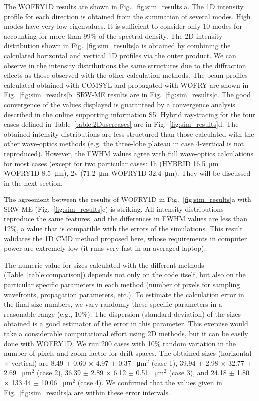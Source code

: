 \documentclass[preprint]{iucr}
\newcommand{\inred}[1]{{\color{red}#1}}
\begin{document}
The WOFRY1D results are shown in Fig.~\ref{fig:sim_results}a. The 1D intensity profile for each direction is obtained from the summation of several modes. High modes have very low eigenvalues. It is sufficient to consider only 10 modes for accounting \inred{for} more \inred{than} 99\% of the spectral density. The 2D intensity distribution shown in Fig.~\ref{fig:sim_results}a is obtained \inred{by} combining the calculated horizontal and vertical 1D profiles via the outer product. 
We can observe in the intensity distributions the same structures due to the diffraction effects \inred{as} those observed with the other calculation methods.
The beam profiles calculated obtained with COMSYL and propagated with WOFRY are shown in Fig.~\ref{fig:sim_results}b. 
SRW-ME results are in Fig.~\ref{fig:sim_results}c. The good convergence of the values displayed is guarantee\inred{d} by a convergence analysis described in \inred{the online supporting information S5}.
Hybrid ray-tracing for the four cases defined in Table~\ref{table:2Dusercases} are in  Fig.~\ref{fig:sim_results}d. The obtained intensity distributions are less structured than those calculated with the other wave-optics methods (e.g. the three-lobe plateau in case 4-vertical is not reproduced). However, the FWHM values \inred{agree} with full wave-optics calculations for most cases (\inred{except for} two particular cases:
1h (HYBRID \SI{16.5}{\micro\meter} WOFRY1D \SI{8.5}{\micro\meter}),
2v (\SI{71.2}{\micro\meter} WOFRY1D \SI{32.4}{\micro\meter}). They will be discussed in the next section.

The agreement between the results of WOFRY1D in Fig.~\ref{fig:sim_results}a with SRW-ME (Fig.~\ref{fig:sim_results}c) is striking. All intensity distributions reproduce the same features, and the differences in FWHM values are less than 12\%, a value that is compatible with the errors of the simulations. 
This result validates the 1D CMD method proposed here, whose requirements in computer power are extremely low (it runs very fast in an averaged laptop). 

The numeric value for sizes calculated with the different methods (Table~\ref{table:comparison}) depends not only on the code itself, but also on the particular specific parameters in each method (number of pixels for sampling wavefronts, propagation parameters, etc.). To estimate the calculation error in the final size numbers, we vary randomly these specific parameters in a reasonable range (e.g., 10\%). The dispersion (standard deviation) of the sizes obtained \inred{is a good estimator} of the error in this parameter. This exercise would take a considerable computational effort using 2D methods, but it can be easily done with WOFRY1D. We run 200 cases with 10\% random \inred{variation in the number of pixels and zoom factor for} drift spaces. The obtained sizes (horizontal $\times$ vertical) are  
8.49 $\pm$ 0.60 $\times$ 4.97 $\pm$ 0.37 \SI{}{\micro\meter}$^2$ (case 1),
39.94 $\pm$ 2.98 $\times$ 32.77 $\pm$ 2.69 \SI{}{\micro\meter}$^2$ (case 2),
36.39 $\pm$ 2.89 $\times$ 6.12 $\pm$ 0.51 \SI{}{\micro\meter}$^2$ (case 3), and
24.18 $\pm$ 1.80 $\times$ 133.44 $\pm$ 10.06 \SI{}{\micro\meter}$^2$ (case 4). We confirmed that the values given in Fig.~\ref{fig:sim_results}a are within these error intervals.
\end{document}
